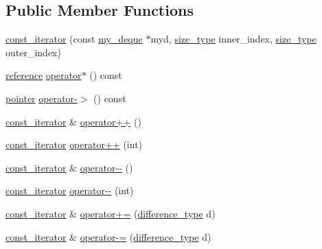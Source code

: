 \subsection*{Public Member Functions}
\begin{DoxyCompactItemize}
\item 
\hyperlink{classmy__deque_1_1const__iterator_acb5c43fe768d891ea54d4efb235acb03}{const\-\_\-iterator} (const \hyperlink{classmy__deque}{my\-\_\-deque} $\ast$myd, \hyperlink{classmy__deque_a61e5e5317fe72a381ce4d45f09544b02}{size\-\_\-type} inner\-\_\-index, \hyperlink{classmy__deque_a61e5e5317fe72a381ce4d45f09544b02}{size\-\_\-type} outer\-\_\-index)
\item 
\hyperlink{classmy__deque_1_1const__iterator_a37cd7eef8e73e5a65d7a9d16ba6d3ed2}{reference} \hyperlink{classmy__deque_1_1const__iterator_a14715989004b54dc6a1bcd3d2ac78a20}{operator$\ast$} () const 
\item 
\hyperlink{classmy__deque_1_1const__iterator_a6a7d42610f3b7e55f38897c151862071}{pointer} \hyperlink{classmy__deque_1_1const__iterator_aef7e08cfcebb0c0932422f420645e1ce}{operator-\/$>$} () const 
\item 
\hyperlink{classmy__deque_1_1const__iterator}{const\-\_\-iterator} \& \hyperlink{classmy__deque_1_1const__iterator_a8bc45a394bb73728fca1ebf90755d662}{operator++} ()
\item 
\hyperlink{classmy__deque_1_1const__iterator}{const\-\_\-iterator} \hyperlink{classmy__deque_1_1const__iterator_adf9ea902391ac993088e7c969c64e4de}{operator++} (int)
\item 
\hyperlink{classmy__deque_1_1const__iterator}{const\-\_\-iterator} \& \hyperlink{classmy__deque_1_1const__iterator_ae5dffda4ac0a8ad59a4954dcdeeb5f98}{operator-\/-\/} ()
\item 
\hyperlink{classmy__deque_1_1const__iterator}{const\-\_\-iterator} \hyperlink{classmy__deque_1_1const__iterator_a83c405a1e0b9672c074aaa933a7127df}{operator-\/-\/} (int)
\item 
\hyperlink{classmy__deque_1_1const__iterator}{const\-\_\-iterator} \& \hyperlink{classmy__deque_1_1const__iterator_a2bbc121cc446855edcb9d20451cae024}{operator+=} (\hyperlink{classmy__deque_1_1const__iterator_abe3b655aa980c8a12ba486058464c91d}{difference\-\_\-type} d)
\item 
\hyperlink{classmy__deque_1_1const__iterator}{const\-\_\-iterator} \& \hyperlink{classmy__deque_1_1const__iterator_ab51576a76fd33fd55be87ca4c467dc96}{operator-\/=} (\hyperlink{classmy__deque_1_1const__iterator_abe3b655aa980c8a12ba486058464c91d}{difference\-\_\-type} d)
\end{DoxyCompactItemize}
